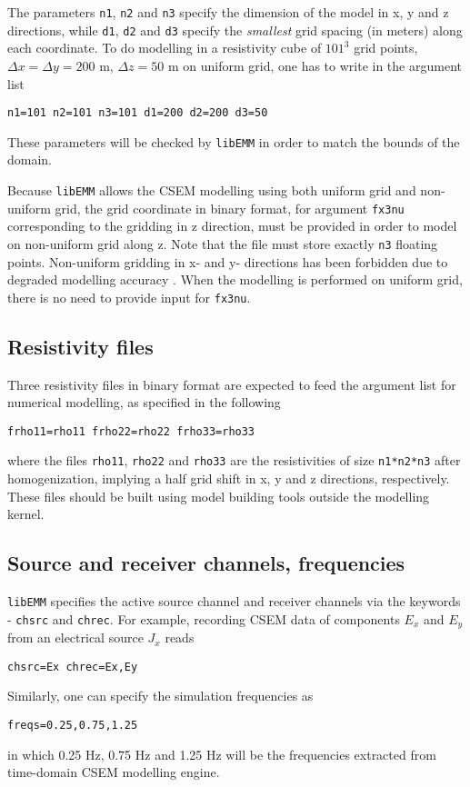 \documentclass[a4paper,10pt]{article}
\begin{document}
The parameters  \verb|n1|, \verb|n2| and \verb|n3| specify the dimension of the model in x, y and z directions, while \verb|d1|, \verb|d2| and \verb|d3| specify the \emph{smallest} grid spacing (in meters) along each coordinate. To do modelling in a resistivity cube of $101^3$ grid points, $\Delta x=\Delta y=200$ m, $\Delta z=50$ m on uniform grid, one has to write in the argument list
\begin{verbatim}
n1=101 n2=101 n3=101 d1=200 d2=200 d3=50
\end{verbatim}
These parameters will be checked by \verb|libEMM| in order to match the bounds of the domain.

Because \verb|libEMM| allows the CSEM modelling using both uniform grid and non-uniform grid, the grid coordinate in binary format, for argument \verb|fx3nu| corresponding to the gridding in z direction, must be provided in order to model on non-uniform grid along z. Note that the file must store exactly \verb|n3| floating points. Non-uniform gridding in x- and y- directions has been forbidden due to degraded modelling accuracy \citep{Yang_2023_HFDNU}. When the modelling is performed on uniform grid, there is no need to provide input for \verb|fx3nu|.


\subsection{Resistivity files}

Three resistivity files in binary format are expected to feed the argument list for numerical modelling, as specified in the following
\begin{verbatim}
frho11=rho11 frho22=rho22 frho33=rho33
\end{verbatim}
where the files \verb|rho11|, \verb|rho22| and \verb|rho33| are the resistivities of size \verb|n1*n2*n3| after homogenization, implying a half grid shift in x, y and z directions, respectively. These files should be built using model building tools outside the modelling kernel.

\subsection{Source and receiver channels, frequencies}

\verb|libEMM| specifies the active source channel and receiver channels via the keywords - \verb|chsrc| and \verb|chrec|. For example, recording CSEM data of components $E_x$ and $E_y$ from an electrical source $J_x$ reads
\begin{verbatim}
chsrc=Ex chrec=Ex,Ey
\end{verbatim}
Similarly, one can specify the simulation frequencies as
\begin{verbatim}
freqs=0.25,0.75,1.25
\end{verbatim}
in which 0.25 Hz, 0.75 Hz and 1.25 Hz will be the frequencies extracted from time-domain CSEM modelling engine.
\end{document}
